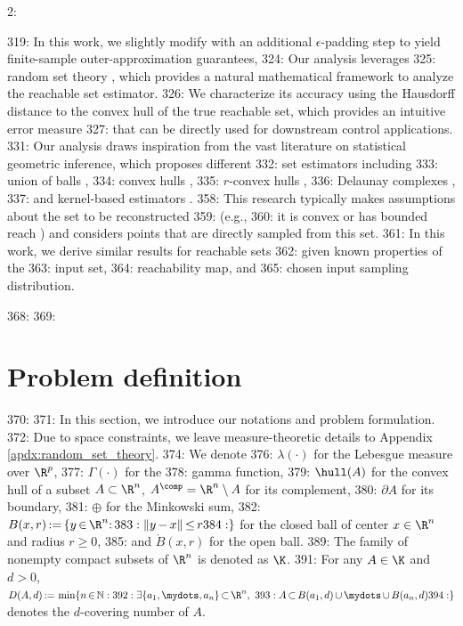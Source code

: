 2: \documentclass[12pt]{l4dc2022} %
\begin{document}
319: In this work, we slightly modify \randup \citep{LewPavone2020} with an additional $\epsilon$-padding step to yield finite-sample outer-approximation guarantees,  %
324: Our analysis leverages  
325: random set theory \citep{Matheron1975,Molchanov_BookTheoryOfRandomSets2017}, which provides a natural mathematical framework to analyze the reachable set estimator. %
326: We characterize its accuracy using the Hausdorff distance to the convex hull of the true reachable set, which provides an intuitive error measure %
327: that can be directly used for downstream control applications. 
331: Our analysis draws inspiration from the vast literature on statistical geometric inference, which proposes different %
332: set estimators including  
333: union of balls \citep{Devroye1980,Baillo2001}, 
334: convex hulls \citep{RipleyPoissonForest1977,Schneider1988,Dumbgen1996}, 
335: $r$-convex hulls \citep{Rodriguez2016,RodriguezCasal2019,AriasCastro2019},
336: Delaunay complexes \citep{Boissonnat2013,AamariPhD2017,Aamari2018}, 
337: and kernel-based estimators \citep{DeVito2014,Rudi2017}. 
358: This research typically makes assumptions about the set to be reconstructed %
359: (e.g., %
360: it is convex \citep{Dumbgen1996} or has bounded reach \citep{Cuevas2009}) and considers points that are directly sampled from this set. 
361: In this work, we derive similar results for reachable sets 
362: given known properties of the 
363: input set,  
364: reachability map, and 
365: chosen input sampling distribution. 

368: \vspace{-1mm}
369: \section{Problem definition}\label{sec:formal_setting}
370: \vspace{-1mm}
371: In this section, we introduce our notations and  problem formulation. %
372: Due to space constraints, we leave measure-theoretic details to Appendix \ref{apdx:random_set_theory}.  
374: We denote 
376: $\lambda(\cdot)$ for the Lebesgue measure over $\R^p$, 
377: $\Gamma(\cdot)$ for the %
378: gamma function, 
379: $\hull(A)$ for the convex hull of a subset $A\subset\R^n$, $A^\comp=\R^n\setminus A$ for its complement, 
380: $\partial A$ for its boundary, 
381: $\oplus$ for the Minkowski sum, 
382: $B(x,r)\,{:=}\,\{y\,{\in}\,\R^n{:}\, 
383:  \|y\,{-}\,x\|\,{\leq}\, r
384: \}$ for the closed ball of center $x\in\R^n$ and radius $r\geq 0$, 
385: and $\mathring{B}(x,r)$ for the open ball. 
389: The family of nonempty compact subsets of $\R^n$ is denoted as $\K$.  
391: For any $A\in\K$ and $d>0$, $D(A, d)\,{:=}\,\min\{n\,{\in}\,\mathbb{N} : 
392: \exists \{a_1,{\mydots},a_n\}\,{\subset}\,\R^n, \ 
393: A\,{\subset}\, B(a_1,d)\,{\cup}\,{\mydots}\,{\cup}\, B(a_n,d)
394: \}$ denotes the $d$-covering number of $A$. 
\end{document}
